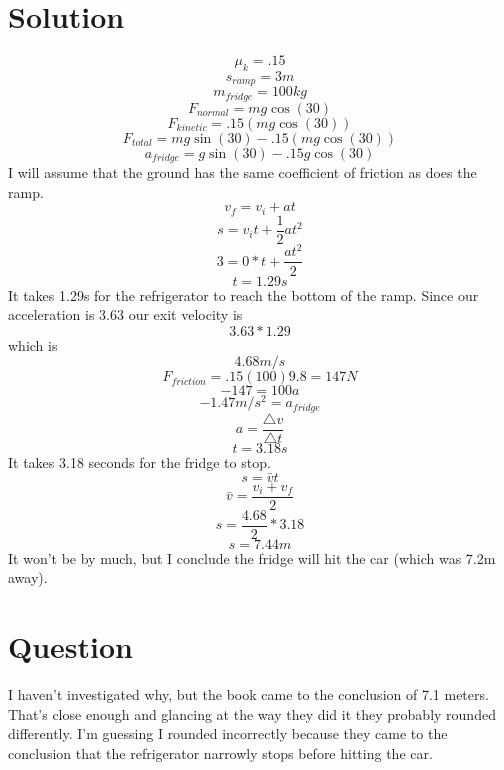 \documentclass{article}
\begin{document}
\section{Solution}
\[ \mu_k = .15 \]
\[ s_{ramp}=3m \]
\[ m_{fridge}=100kg \]
\[ F_{normal}=mg\cos(30) \]
\[ F_{kinetic}=.15(mg\cos(30)) \]
\[ F_{total}=mg\sin(30)-.15(mg\cos(30)) \]
\[ a_{fridge}=g\sin(30)-.15g\cos(30) \]
I will assume that the ground has the same coefficient of friction as does the ramp.
\[  v_f=v_i+at \]
\[ s=v_it+\frac{1}{2}at^2 \]
\[ 3=0*t+\frac{at^2}{2} \]
\[ t=1.29s \]
It takes 1.29s for the refrigerator to reach the bottom of the ramp. Since our acceleration is 3.63 our exit velocity is \[ 3.63*1.29 \] which is \[ 4.68m/s \]
\[ F_{friction}=.15(100)9.8=147N \]
\[ -147=100a \]
\[ -1.47m/s^2=a_{fridge} \]
\[ a=\frac{\triangle{v}}{\triangle{t}} \]
\[ t=3.18s \]
It takes 3.18 seconds for the fridge to stop.
\[ s=\bar{v}t \]
\[ \bar{v} = \frac{v_i+v_f}{2} \]
\[ s=\frac{4.68}{2}*3.18 \]
\[ s=7.44m \]
It won't be by much, but I conclude the fridge will hit the car (which was 7.2m away).
\section{Question}
I haven't investigated why, but the book came to the conclusion of 7.1 meters. That's close enough and glancing at the way they did it they probably rounded differently. I'm guessing I rounded incorrectly because they came to the conclusion that the refrigerator narrowly stops before hitting the car.
\end{document}
